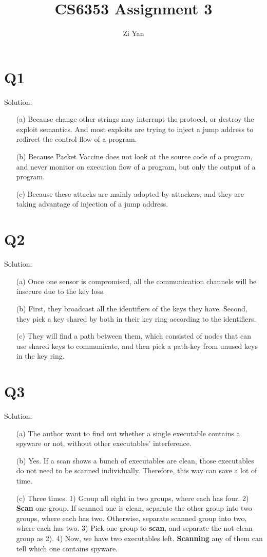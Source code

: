 \documentclass[12pt,letterpaper]{article}
\author{Zi Yan}
\title{CS6353 Assignment 3}
\date{}
\begin{document}
\maketitle

\section{Q1}
Solution:
\begin{itemize}
 \item[(a)] Because change other strings may interrupt the protocol,
 or destroy the exploit semantics. And most exploits are trying to 
 inject a jump address to redirect the control flow of a program.
 \item[(b)] Because Packet Vaccine does not look at the source code
 of a program, and never monitor on execution flow of a program, 
 but only the output of a program.
 \item[(c)] Because these attacks are mainly adopted by attackers,
 and they are taking advantage of injection of a jump address.
\end{itemize}

\section{Q2}
Solution:
\begin{itemize}
 \item[(a)] Once one sensor is compromised, all the communication
 channels will be insecure due to the key loss.
 \item[(b)] First, they broadcast all the identifiers of the keys they have.
 Second, they pick a key shared by both in their key ring according to
 the identifiers.
 \item[(c)] They will find a path between them, which consisted of nodes
 that can use shared keys to communicate, and then pick a path-key from
 unused keys in the key ring.
\end{itemize}

\section{Q3}
Solution:
\begin{itemize}
 \item[(a)] The author want to find out whether a single executable 
 contains a spyware or not, without other executables' interference.
 \item[(b)] Yes. If a scan shows a bunch of executables are clean, 
 those executables do not need to be scanned individually. Therefore,
 this way can save a lot of time.
 \item[(c)] Three times. 1) Group all eight in two groups, where each
 has four. 2) \textbf{Scan} one group. If scanned one is clean, separate 
 the other group into two groups, where each has two. Otherwise,
 separate scanned group into two, where each has two. 3) Pick one
 group to \textbf{scan}, and separate the not clean group as 2). 4) Now,
 we have two executables left. \textbf{Scanning} any of them can tell which
 one contains spyware.
\end{itemize}
\end{document}
